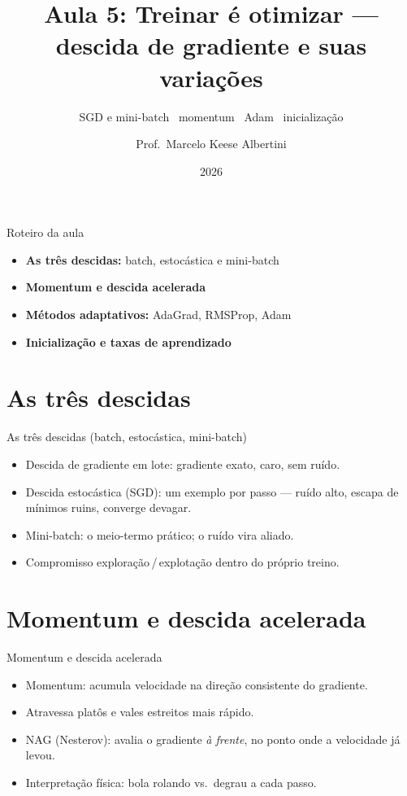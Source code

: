 \documentclass[aspectratio=169, 11pt]{beamer}
\title[Aula 5 — Otimização]{Aula 5: Treinar é otimizar — descida de gradiente e suas variações}
\subtitle[GBC073 — Inteligência Computacional]{SGD e mini-batch \textbullet\ momentum \textbullet\ Adam \textbullet\ inicialização}
\author[Prof.\ Marcelo Albertini]{Prof.\ Marcelo Keese Albertini}
\institute{GBC073 — Inteligência Computacional \textbullet\ Universidade Federal de Uberlândia}
\date{2026}
\begin{document}
\begin{frame}
  \titlepage
\end{frame}

\begin{frame}{Roteiro da aula}
  \begin{itemize}\setlength{\itemsep}{0.5ex}
    \item<1-> \textbf{As três descidas:} batch, estocástica e mini-batch
    \item<2-> \textbf{Momentum e descida acelerada}
    \item<3-> \textbf{Métodos adaptativos:} AdaGrad, RMSProp, Adam
    \item<4-> \textbf{Inicialização e taxas de aprendizado}
  \end{itemize}
\end{frame}

\section{As três descidas}

\begin{frame}{As três descidas (batch, estocástica, mini-batch)}
  \begin{itemize}\setlength{\itemsep}{0.4ex}
    \item Descida de gradiente em lote: gradiente exato, caro, sem ruído.
    \item Descida estocástica (SGD): um exemplo por passo — ruído alto, escapa
          de mínimos ruins, converge devagar.
    \item Mini-batch: o meio-termo prático; o ruído vira aliado.
    \item Compromisso exploração\,/\,explotação dentro do próprio treino.
  \end{itemize}
\end{frame}

\section{Momentum e descida acelerada}

\begin{frame}{Momentum e descida acelerada}
  \begin{itemize}\setlength{\itemsep}{0.4ex}
    \item Momentum: acumula velocidade na direção consistente do gradiente.
    \item Atravessa platôs e vales estreitos mais rápido.
    \item NAG (Nesterov): avalia o gradiente \emph{à frente}, no ponto onde a
          velocidade já levou.
    \item Interpretação física: bola rolando vs.\ degrau a cada passo.
  \end{itemize}
\end{frame}
\end{document}
